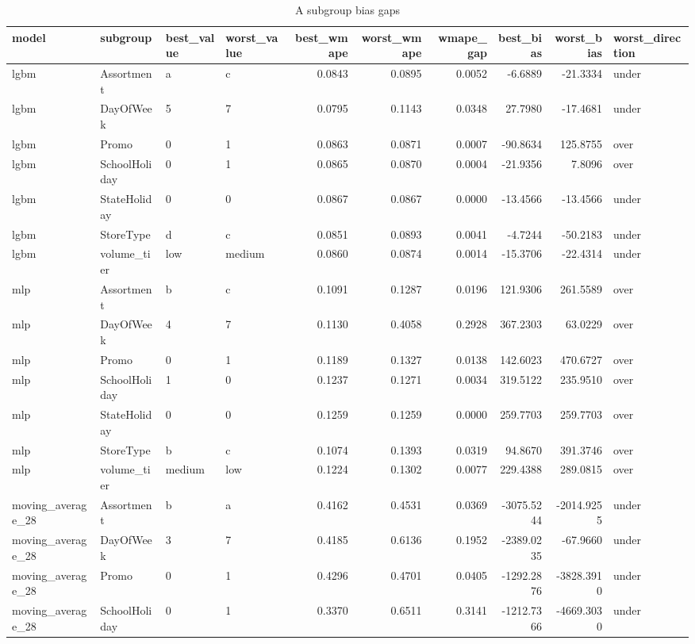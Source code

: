 \begin{table}
\caption{A subgroup bias gaps}
\label{tab:bias-gaps-A}
\begin{tabular}{llllrrrrrl}
\toprule
model & subgroup & best\_value & worst\_value & best\_wmape & worst\_wmape & wmape\_gap & best\_bias & worst\_bias & worst\_direction \\
\midrule
lgbm & Assortment & a & c & 0.0843 & 0.0895 & 0.0052 & -6.6889 & -21.3334 & under \\
lgbm & DayOfWeek & 5 & 7 & 0.0795 & 0.1143 & 0.0348 & 27.7980 & -17.4681 & under \\
lgbm & Promo & 0 & 1 & 0.0863 & 0.0871 & 0.0007 & -90.8634 & 125.8755 & over \\
lgbm & SchoolHoliday & 0 & 1 & 0.0865 & 0.0870 & 0.0004 & -21.9356 & 7.8096 & over \\
lgbm & StateHoliday & 0 & 0 & 0.0867 & 0.0867 & 0.0000 & -13.4566 & -13.4566 & under \\
lgbm & StoreType & d & c & 0.0851 & 0.0893 & 0.0041 & -4.7244 & -50.2183 & under \\
lgbm & volume\_tier & low & medium & 0.0860 & 0.0874 & 0.0014 & -15.3706 & -22.4314 & under \\
mlp & Assortment & b & c & 0.1091 & 0.1287 & 0.0196 & 121.9306 & 261.5589 & over \\
mlp & DayOfWeek & 4 & 7 & 0.1130 & 0.4058 & 0.2928 & 367.2303 & 63.0229 & over \\
mlp & Promo & 0 & 1 & 0.1189 & 0.1327 & 0.0138 & 142.6023 & 470.6727 & over \\
mlp & SchoolHoliday & 1 & 0 & 0.1237 & 0.1271 & 0.0034 & 319.5122 & 235.9510 & over \\
mlp & StateHoliday & 0 & 0 & 0.1259 & 0.1259 & 0.0000 & 259.7703 & 259.7703 & over \\
mlp & StoreType & b & c & 0.1074 & 0.1393 & 0.0319 & 94.8670 & 391.3746 & over \\
mlp & volume\_tier & medium & low & 0.1224 & 0.1302 & 0.0077 & 229.4388 & 289.0815 & over \\
moving\_average\_28 & Assortment & b & a & 0.4162 & 0.4531 & 0.0369 & -3075.5244 & -2014.9255 & under \\
moving\_average\_28 & DayOfWeek & 3 & 7 & 0.4185 & 0.6136 & 0.1952 & -2389.0235 & -67.9660 & under \\
moving\_average\_28 & Promo & 0 & 1 & 0.4296 & 0.4701 & 0.0405 & -1292.2876 & -3828.3910 & under \\
moving\_average\_28 & SchoolHoliday & 0 & 1 & 0.3370 & 0.6511 & 0.3141 & -1212.7366 & -4669.3030 & under \\

\end{tabular}
\end{table}
